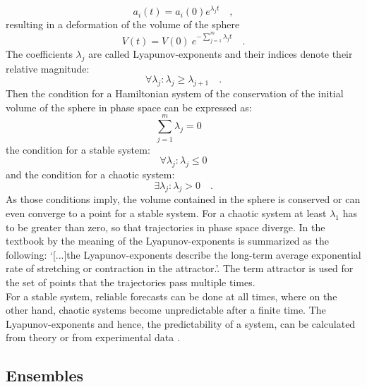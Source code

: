 \begin{equation}
    a_{i}(t) = a_{i}(0) e^{\lambda_{j}t} \quad ,
\end{equation}
resulting in a deformation of the volume of the sphere
\begin{equation}
    V(t) = V(0) \ e^{-\sum^{m}_{j=1} \lambda_{j}t} \quad .
\end{equation}
The coefficients $\lambda_{j}$  are called Lyapunov-exponents and their indices denote their relative magnitude:
\begin{equation}
  \forall  \lambda_{j}:\lambda_{j} \geq  \lambda_{j+1} \quad .
\end{equation}
Then the condition for a Hamiltonian system of the conservation of the initial volume of the sphere in phase space can be expressed as:
\begin{equation}
    \sum^{m}_{j=1}\lambda_{j} =0 \quad
\end{equation}
the condition for a stable system:
\begin{equation}
     \forall  \lambda_{j}:\lambda_{j} \leq 0
\end{equation}
and the condition for a chaotic system:
\begin{equation}
    \exists  \lambda_{j}:\lambda_{j} > 0 \quad .
\end{equation}
As those conditions imply, the volume contained in the sphere is conserved or can even converge to a point for a stable system. For a chaotic system at least $\lambda_{1}$ has to be greater than zero, so that trajectories in phase space diverge. In the textbook by \citeauthor{kalnay2003atmospheric} \cite{kalnay2003atmospheric} the meaning of the Lyapunov-exponents is summarized as the following: `[...]the Lyapunov-exponents describe the long-term average exponential rate of stretching or contraction in the attractor.'. The term attractor is used for the set of points that the trajectories pass multiple times.\\
For a stable system, reliable forecasts can be done at all times, where on the other hand, chaotic systems become unpredictable after a finite time. The Lyapunov-exponents and hence, the predictability of a system, can be calculated from theory or from experimental data \parencite{eckmann1986liapunov, vannitsem2017predictability, leutbecher2008ensemble}.



\subsection{Ensembles}


